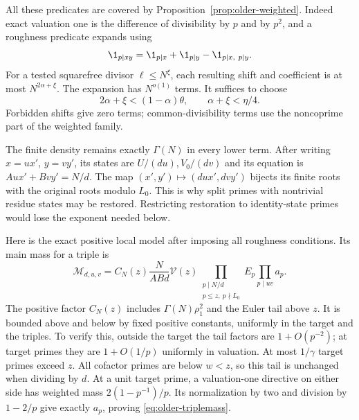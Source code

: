 All these predicates are covered by
Proposition~\ref{prop:older-weighted}.
Indeed exact valuation one is the difference of divisibility by
\(p\) and by \(p^2\), and a roughness predicate expands using
\[
 \1_{p\mid xy}=\1_{p\mid x}+\1_{p\mid y}
                              -\1_{p\mid x,\ p\mid y}.
\]
For a tested squarefree divisor \(\ell\le N^\xi\), each resulting
shift and coefficient is at most \(N^{2\alpha+\xi}\).
The expansion has \(N^{o(1)}\) terms.
It suffices to choose
\begin{equation}\label{eq:older-smallbudgets}
 2\alpha+\xi<(1-\alpha)\theta,\qquad
                         \alpha+\xi<\eta/4 .
\end{equation}
Forbidden shifts give zero terms; common-divisibility terms use the
noncoprime part of the weighted family.

The finite density remains exactly \(\Gamma(N)\) in every lower term.
After writing \(x=ux'\), \(y=vy'\), its states are
\(U/(du),V_0/(dv)\) and its equation is
\(Au x'+Bv y'=N/d\).
The map
\((x',y')\mapsto(du x',dv y')\) bijects its finite roots with the
original roots modulo \(L_0\).
This is why split primes with nontrivial residue states may be
restored.  Restricting restoration to identity-state primes would
lose the exponent needed below.

Here is the exact positive local model after imposing all roughness
conditions.  Its main mass for a triple is
\begin{equation}\label{eq:older-triplemass}
 \mathcal M_{d,u,v}
 =C_N(z)\frac{N}{ABd}\mathcal V(z)
       \prod_{\substack{p\mid N/d\\p\le z,\ p\nmid L_0}}E_p
       \prod_{p\mid uv}a_p .
\end{equation}
The positive factor \(C_N(z)\) includes \(\Gamma(N)\rho_1^2\)
and the Euler tail above \(z\).
It is bounded above and below by fixed positive constants,
uniformly in the target and the triples.
To verify this, outside the target the tail factors are
\(1+O(p^{-2})\); at target primes they are \(1+O(1/p)\) uniformly
in valuation.  At most \(1/\gamma\) target primes exceed \(z\).
All cofactor primes are below \(w<z\), so this tail is unchanged
when dividing by \(d\).
At a unit target prime, a valuation-one directive on either side
has weighted mass \(2(1-p^{-1})/p\).
Its normalization by two and division by \(1-2/p\) give exactly
\(a_p\), proving \eqref{eq:older-triplemass}.

